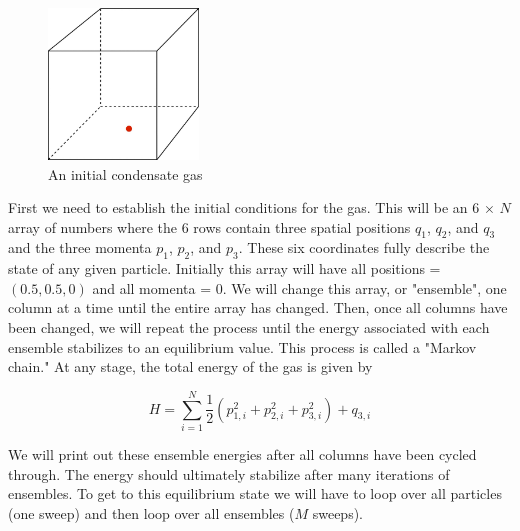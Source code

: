 \documentclass[11pt]{amsart}
\begin{document}
\begin{figure}[ht!]
\centering
\includegraphics[width=40mm]{cube.jpg}
\caption{An initial condensate gas}
\label{overflow}
\end{figure}

\vspace{3 mm}

First we need to establish the initial conditions for the gas.  This will be an 6 $\times$ $N$ array of numbers where the 6 rows contain three spatial positions $q_1$, $q_2$, and $q_3$ and the three momenta $p_1$, $p_2$, and $p_3$.  These six coordinates fully describe the state of any given particle.  Initially this array will have all positions = $(0.5,0.5,0)$ and all momenta = 0.  We will change this array, or "ensemble", one column at a time until the entire array has changed.  Then, once all columns have been changed, we will repeat the process until the energy associated with each ensemble stabilizes to an equilibrium value.  This process is called a "Markov chain."  At any stage, the total energy of the gas is given by

\begin{equation}
H = \sum\limits_{i=1}^N \frac{1}{2} (p_{1,i}^2+p_{2,i}^2+p_{3,i}^2) + q_{3,i}
\end{equation}
\vspace{2 mm}

We will print out these ensemble energies after all columns have been cycled through.  The energy should ultimately stabilize after many iterations of ensembles.  To get to this equilibrium state we will have to loop over all particles (one sweep) and then loop over all ensembles ($M$ sweeps).
\vspace{2 mm}
\end{document}
